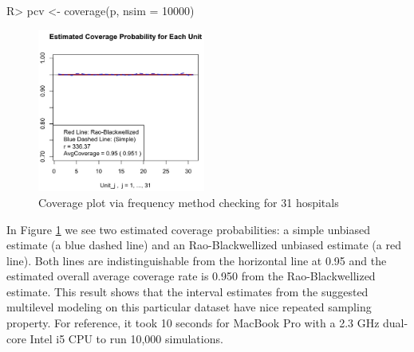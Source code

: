 \documentclass[article]{jss}
\begin{document}
\begin{CodeChunk}
\begin{CodeInput}
R> pcv <- coverage(p, nsim = 10000)
\end{CodeInput}
\end{CodeChunk}
\begin{figure}[h] 
\begin{center}
\includegraphics[width = 5.5cm]{hospital2.png}
\caption{Coverage plot via frequency method checking for 31 hospitals}
\label{fig:hospitalcoverage}
\end{center}
\end{figure}

In Figure \ref{fig:hospitalcoverage} we see two estimated coverage probabilities: a simple unbiased estimate (a blue dashed line) and an Rao-Blackwellized unbiased estimate (a red line). Both lines are indistinguishable from the horizontal line at 0.95 and the estimated overall average coverage rate is 0.950 from the Rao-Blackwellized estimate. This result shows that the interval estimates from the suggested multilevel modeling on this particular dataset have nice repeated sampling property. For reference, it took 10 seconds for MacBook Pro with a 2.3 GHz dual-core Intel i5 CPU to run 10,000 simulations.



\end{document}
